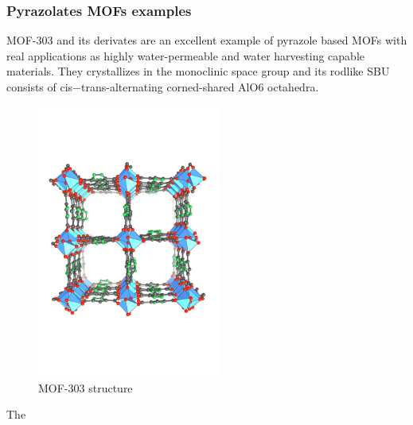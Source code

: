 \documentclass[../Master.tex]{subfiles}
\begin{document}
\subsubsection{Pyrazolates MOFs examples}
MOF-303 and its derivates are an excellent example of pyrazole based MOFs with real applications as highly water-permeable and water harvesting capable materials.
They crystallizes in the monoclinic space group and its rodlike SBU consists of cis−trans-alternating corned-shared AlO6 octahedra.
\begin{figure}[h!]
	\centering
	\includegraphics[width=6cm,keepaspectratio]{Images/MOF303.jpeg}
	\caption{MOF-303 structure}\label{fig:mof303structure}
\end{figure}
The
\end{document}
